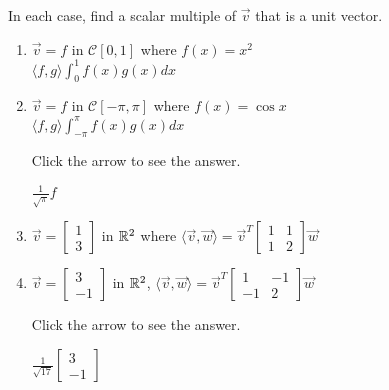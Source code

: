 \documentclass{ximera}
\begin{document}
\begin{problem}\label{prob:inner_prod_3}
In each case, find a scalar multiple of $\vec{v}$ that is a unit vector.

\begin{enumerate} 
\item $\vec{v} = f$ in $\mathcal{C}[0, 1]$ where
$f(x) = x^2$  \\ $\langle f, g \rangle \int_{0}^{1} f(x)g(x)dx$

\item $\vec{v} = f$ in $\mathcal{C}[-\pi, \pi]$ where
$f(x) = \cos x$ \\ $\langle f, g \rangle \int_{-\pi}^{\pi} f(x)g(x)dx$

Click the arrow to see the answer.
\begin{expandable}
$\frac{1}{\sqrt{\pi}}f$
\end{expandable}

\item $\vec{v} =
\left[ \begin{array}{r}
1 \\
3
\end{array} \right]$
in $\mathbb{R}^2$ where $\langle \vec{v}, \vec{w} \rangle = \vec{v}^T
\left[ \begin{array}{rr}
1 & 1 \\
1 & 2
\end{array} \right]
\vec{w}$

\item $ \vec{v} =
\left[ \begin{array}{r}
3 \\
-1
\end{array} \right]$
in $\mathbb{R}^2$, $\langle \vec{v}, \vec{w} \rangle = \vec{v}^T
\left[ \begin{array}{rr}
1 & -1 \\
-1 & 2
\end{array} \right]
\vec{w}$

Click the arrow to see the answer.
\begin{expandable}
$\frac{1}{\sqrt{17}}
\left[ \begin{array}{r}
3 \\
-1
\end{array} \right]$
\end{expandable}

\end{enumerate}
\end{problem}
\end{document}
